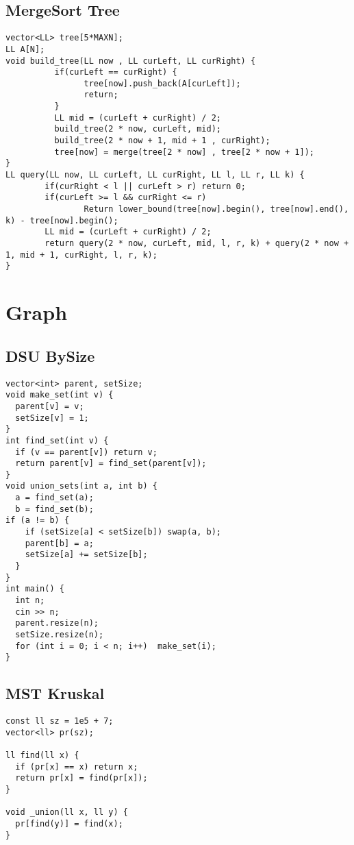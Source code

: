 \documentclass[FSZ,a4paper,onesided]{article}
\begin{document}
\begin{multicols*}{\COLS}
\subsection{MergeSort Tree}
\begin{lstlisting}
vector<LL> tree[5*MAXN];
LL A[N];
void build_tree(LL now , LL curLeft, LL curRight) {
          if(curLeft == curRight) {
                tree[now].push_back(A[curLeft]);
                return;
          }
          LL mid = (curLeft + curRight) / 2;
          build_tree(2 * now, curLeft, mid);
          build_tree(2 * now + 1, mid + 1 , curRight);
          tree[now] = merge(tree[2 * now] , tree[2 * now + 1]);
}
LL query(LL now, LL curLeft, LL curRight, LL l, LL r, LL k) {
        if(curRight < l || curLeft > r) return 0;
        if(curLeft >= l && curRight <= r)
                Return lower_bound(tree[now].begin(), tree[now].end(), k) - tree[now].begin();
        LL mid = (curLeft + curRight) / 2;
        return query(2 * now, curLeft, mid, l, r, k) + query(2 * now + 1, mid + 1, curRight, l, r, k);
}\end{lstlisting}
\section{Graph}
\subsection{DSU BySize}
\begin{lstlisting}
vector<int> parent, setSize;
void make_set(int v) {
  parent[v] = v;
  setSize[v] = 1;
}
int find_set(int v) {
  if (v == parent[v]) return v;
  return parent[v] = find_set(parent[v]);
}
void union_sets(int a, int b) {
  a = find_set(a);
  b = find_set(b);
if (a != b) {
    if (setSize[a] < setSize[b]) swap(a, b);
    parent[b] = a;
    setSize[a] += setSize[b];
  }
}
int main() {
  int n;
  cin >> n;
  parent.resize(n);
  setSize.resize(n);
  for (int i = 0; i < n; i++)  make_set(i);
}\end{lstlisting}
\subsection{MST Kruskal}
\begin{lstlisting}
const ll sz = 1e5 + 7;
vector<ll> pr(sz);

ll find(ll x) {
  if (pr[x] == x) return x;
  return pr[x] = find(pr[x]);
}

void _union(ll x, ll y) {
  pr[find(y)] = find(x);
}


\end{lstlisting}
\end{multicols*}
\end{document}
